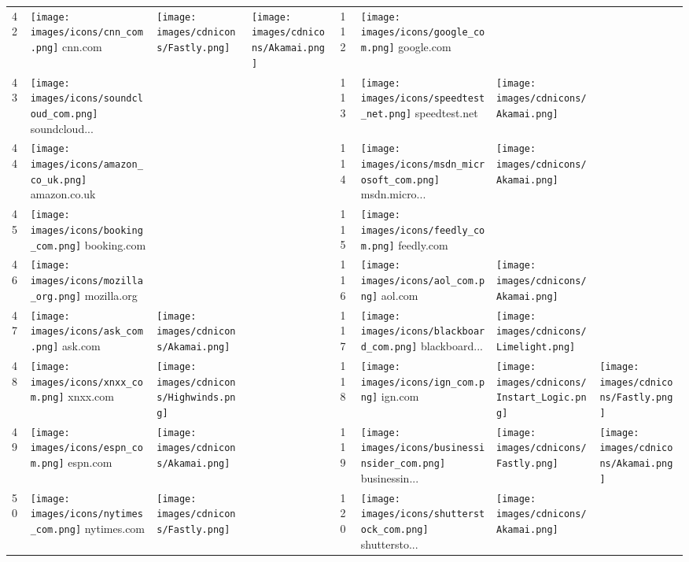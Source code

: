 \begin{table}[tbp]
\begin{tabular}{|llll|llll|}
42 & \texttt{[image: images/icons/cnn\_com.png]} cnn.com & \texttt{[image: images/cdnicons/Fastly.png]} & \texttt{[image: images/cdnicons/Akamai.png]} & 112 & \texttt{[image: images/icons/google\_com.png]} google.com & & \\
43 & \texttt{[image: images/icons/soundcloud\_com.png]} soundcloud... & & & 113 & \texttt{[image: images/icons/speedtest\_net.png]} speedtest.net & \texttt{[image: images/cdnicons/Akamai.png]} & \\
44 & \texttt{[image: images/icons/amazon\_co\_uk.png]} amazon.co.uk & & & 114 & \texttt{[image: images/icons/msdn\_microsoft\_com.png]} msdn.micro... & \texttt{[image: images/cdnicons/Akamai.png]} & \\
45 & \texttt{[image: images/icons/booking\_com.png]} booking.com & & & 115 & \texttt{[image: images/icons/feedly\_com.png]} feedly.com & & \\
46 & \texttt{[image: images/icons/mozilla\_org.png]} mozilla.org & & & 116 & \texttt{[image: images/icons/aol\_com.png]} aol.com & \texttt{[image: images/cdnicons/Akamai.png]} & \\
47 & \texttt{[image: images/icons/ask\_com.png]} ask.com & \texttt{[image: images/cdnicons/Akamai.png]} & & 117 & \texttt{[image: images/icons/blackboard\_com.png]} blackboard... & \texttt{[image: images/cdnicons/Limelight.png]} & \\
48 & \texttt{[image: images/icons/xnxx\_com.png]} xnxx.com & \texttt{[image: images/cdnicons/Highwinds.png]} & & 118 & \texttt{[image: images/icons/ign\_com.png]} ign.com & \texttt{[image: images/cdnicons/Instart\_Logic.png]} & \texttt{[image: images/cdnicons/Fastly.png]} \\
49 & \texttt{[image: images/icons/espn\_com.png]} espn.com & \texttt{[image: images/cdnicons/Akamai.png]} & & 119 & \texttt{[image: images/icons/businessinsider\_com.png]} businessin... & \texttt{[image: images/cdnicons/Fastly.png]} & \texttt{[image: images/cdnicons/Akamai.png]} \\
50 & \texttt{[image: images/icons/nytimes\_com.png]} nytimes.com & \texttt{[image: images/cdnicons/Fastly.png]} & & 120 & \texttt{[image: images/icons/shutterstock\_com.png]} shuttersto... & \texttt{[image: images/cdnicons/Akamai.png]} & \\

\end{tabular}
\end{table}
